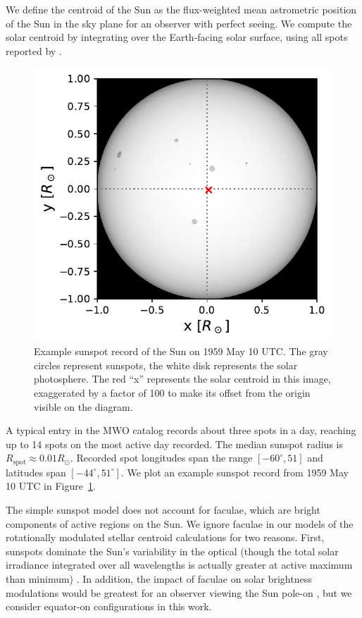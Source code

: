 We define the centroid of the Sun as the flux-weighted mean astrometric position of the Sun in the sky plane for an observer with perfect seeing. We compute the solar centroid by integrating over the Earth-facing solar surface, using all spots reported by \citet{Howard1984}. 

\begin{figure}
\begin{center}
\includegraphics[scale=0.8]{gaia/example_sun.pdf}
\end{center}
\caption{Example sunspot record of the Sun on 1959 May 10 UTC. The gray circles represent sunspots, the white disk represents the solar photosphere. The red ``x'' represents the solar centroid in this image, exaggerated by a factor of 100 to make its offset from the origin visible on the diagram.} \label{fig:sunexample}
\end{figure}
A typical entry in the MWO catalog records about three spots in a day, reaching up to 14 spots on the most active day recorded. The median sunspot radius is $R_{\mathrm{spot}} \approx 0.01 R_\odot$. Recorded spot longitudes span the range $[-60^\circ, 51]$ and latitudes span $[-44^\circ, 51^\circ]$. We plot an example sunspot record from 1959 May 10 UTC in Figure~\ref{fig:sunexample}.

The simple sunspot model does not account for faculae, which are bright components of active regions on the Sun. We ignore faculae in our models of the rotationally modulated stellar centroid calculations for two reasons. First, sunspots dominate the Sun's variability in the optical (though the total solar irradiance integrated over all wavelengths is actually greater at active maximum than minimum) \citep{Shapiro2016}. In addition, the impact of faculae on solar brightness modulations would be greatest for an observer viewing the Sun pole-on \citep{Radick1998, Shapiro2016}, but we consider equator-on configurations in this work. 

